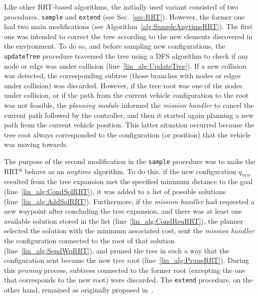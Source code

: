 Like other \ac{RRT}-based algorithms, the initially used variant consisted of
two procedures, \texttt{sample} and \texttt{extend} (see Sec.~\ref{sec:RRT}).
However, the former one had two main modifications (see
Algorithm~\ref{alg:SampleAnytimeRRT}). The first one was intended to correct the
tree according to the new elements discovered in the environment. To do so, and
before sampling new configurations, the \texttt{updateTree} procedure traversed
the tree using a \ac{DFS} algorithm to check if any node or edge was under
collision (line~\ref{lin_alg:UpdateTree}). If a new collision was detected, the
corresponding subtree (\ie those branches with nodes or edges under collision)
was discarded. However, if the tree root was one of the nodes under collision,
or if the path from the current vehicle configuration to the root was not
feasible, the \textit{planning module} informed the \textit{mission handler} to
cancel the current path followed by the controller, and then it started again
planning a new path from the current vehicle position. This latter situation
occurred because the tree root always corresponded to the configuration (or
position) that the vehicle was moving towards.

The purpose of the second modification in the \texttt{sample} procedure was to
make the \ac{RRT*} behave as an \textit{anytime} algorithm. To do this, if the
new configuration $q_{new}$ resulted from the tree expansion met the specified
minimum distance to the goal (line~\ref{lin_alg:CondSolRRT}), it was added to a
list of possible solutions (line~\ref{lin_alg:AddSolRRT}). Furthermore, if the
\textit{mission handler} had requested a new waypoint after concluding the tree
expansion, and there was at least one available solution stored in the list
(line~\ref{lin_alg:CondReqRRT}), the planner selected the solution with the
minimum associated cost, sent the \textit{mission handler} the configuration
connected to the root of that solution (line~\ref{lin_alg:SendWpRRT}), and
pruned the tree in such a way that the configuration sent became the new tree
root (line~\ref{lin_alg:PruneRRT}). During this \textit{pruning} process,
subtrees connected to the former root (excepting the one that corresponds to the
new root) were discarded. The \texttt{extend} procedure, on the other hand, remained
as originally proposed in~\cite{Karaman2011}.

